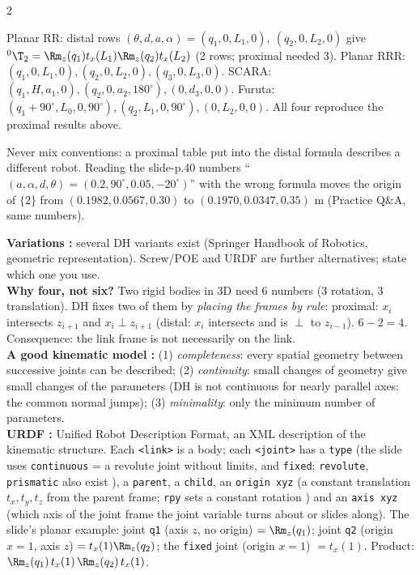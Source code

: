 \begin{multicols}{2}
\begin{worked}
Planar RR: distal rows $(\theta,d,a,\alpha)=(q_1,0,L_1,0),\ (q_2,0,L_2,0)$ give ${}^0\T_2=\Rm_z(q_1)t_x(L_1)\Rm_z(q_2)t_x(L_2)$ (2 rows; proximal needed 3). Planar RRR: $(q_1,0,L_1,0),(q_2,0,L_2,0),(q_3,0,L_3,0)$. SCARA: $(q_1,H,a_1,0),(q_2,0,a_2,180^\circ),(0,d_3,0,0)$. Furuta: $(q_1{+}90^\circ,L_0,0,90^\circ),(q_2,L_1,0,90^\circ),(0,L_2,0,0)$. All four reproduce the proximal results above. \chk
\end{worked}
\begin{trap}
Never mix conventions: a proximal table put into the distal formula describes a different robot. Reading the slide-p.40 numbers ``$(a,\alpha,d,\theta)=(0.2,90^\circ,0.05,-20^\circ)$'' with the wrong formula moves the origin of $\{2\}$ from $(0.1982,0.0567,0.30)$ to $(0.1970,0.0347,0.35)$ m (Practice Q\&A, same numbers). \chk
\end{trap}
\textbf{Variations :} several DH variants exist (Springer Handbook of Robotics, geometric representation). Screw/POE and URDF are further alternatives; state which one you use.\\
\textbf{Why four, not six? } Two rigid bodies in 3D need 6 numbers (3 rotation, 3 translation). DH fixes two of them by \emph{placing the frames by rule}: proximal: $x_i$ intersects $z_{i+1}$ and $x_i\perp z_{i+1}$ (distal: $x_i$ intersects and is $\perp$ to $z_{i-1}$). $6-2=4$. Consequence: the link frame is not necessarily on the link.\\
\textbf{A good kinematic model :} (1) \emph{completeness}: every spatial geometry between successive joints can be described; (2) \emph{continuity}: small changes of geometry give small changes of the parameters (DH is not continuous for nearly parallel axes: the common normal jumps); (3) \emph{minimality}: only the minimum number of parameters.\\
\textbf{URDF :} Unified Robot Description Format, an XML description of the kinematic structure. Each \texttt{<link>} is a body; each \texttt{<joint>} has a \texttt{type} (the slide uses \texttt{continuous} = a revolute joint without limits, and \texttt{fixed}; \texttt{revolute}, \texttt{prismatic} also exist \added), a \texttt{parent}, a \texttt{child}, an \texttt{origin xyz} (a constant translation $t_x,t_y,t_z$ from the parent frame; \texttt{rpy} sets a constant rotation \added) and an \texttt{axis xyz} (which axis of the joint frame the joint variable turns about or slides along). The slide's planar example: joint \texttt{q1} (axis $z$, no origin) $=\Rm_z(q_1)$; joint \texttt{q2} (origin $x=1$, axis $z$) $=t_x(1)\Rm_z(q_2)$; the \texttt{fixed} joint (origin $x=1$) $=t_x(1)$. Product: $\Rm_z(q_1)\,t_x(1)\,\Rm_z(q_2)\,t_x(1)$.


\end{multicols}
